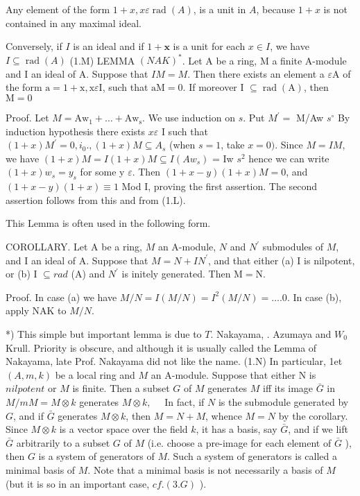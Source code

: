 Any element of the form $1+x, x \varepsilon \operatorname{rad}(A)$, is a unit in $A$, because $1+x$ is not contained in any maximal ideal.

Conversely, if $I$ is an ideal and if $1+\mathbf{x}$ is a unit for each $x \in I$, we have $I \subseteq \operatorname{rad}(A)$ (1.M) LEMMA $(N A K)^{*}$. Let A be a ring, M a finite A-module and I an ideal of A. Suppose that $I M=M$. Then there exists an element a $\varepsilon \mathrm{A}$ of the form $\mathrm{a}=1+\mathrm{x}, \mathrm{x} \varepsilon \mathrm{I}$, such that $\mathrm{aM}=0 .$ If moreover I $\subseteq \operatorname{rad}(\mathrm{A})$, then $\mathrm{M}=0$

Proof. Let $M=\mathrm{Aw}_{1}+\ldots+\mathrm{Aw}_{\mathrm{s}}$. We use induction on $s$. Put $M^{\prime}=$ M/Aw $s^{\circ}$ By induction hypothesis there exists $x \varepsilon$ I such that $(1+x) M^{\prime}=0, i_{0} .,(1+x) M \subseteq A_{s}$ (when $s=1$, take $x=0)$. Since $M=I M$, we have $(1+x) M=I(1+x) M \subseteq I\left(A w_{s}\right)$ = Iw $s^{2}$ hence we can write $(1+x) w_{s}=y_{s}$ for some y $\varepsilon$. Then $(1+x-y)(1+x) M=0$, and $(1+x-y)(1+x) \equiv 1$ Mod I, proving the first assertion. The second assertion follows from this and from (1.L).

This Lemma is often used in the following form.

COROLLARY. Let A be a ring, $M$ an A-module, $N$ and $N^{\prime}$ submodules of $M$, and I an ideal of A. Suppose that $M=N+I N^{\prime}$, and that either (a) I is nilpotent, or (b) I $\subseteq r a d$ (A) and $N^{\prime}$ is initely generated. Then $\mathrm{M}=\mathrm{N}$.

Proof. In case (a) we have $M / N=I(M / N)=I^{2}(M / N)=\ldots .0$. In case (b), apply NAK to $M / N$.

*) This simple but important lemma is due to $T$. Nakayama, . Azumaya and $W_{0}$ Krull. Priority is obscure, and although it is usually called the Lemma of Nakayama, late Prof. Nakayama did not like the name. (1.N) In particular, 1et $(A, m, k)$ be a local ring and $M$ an A-module. Suppose that either $\mathrm{N}$ is $n i l p o t e n t$ or $M$ is finite. Then a subset $G$ of $M$ generates $M$ iff its image $\bar{G}$ in $M / m M=M \otimes k$ generates $M \otimes k, \quad$ In fact, if $N$ is the submodule generated by $G$, and if $\bar{G}$ generates $M \otimes k$, then $M=N+M$, whence $M=N$ by the corollary. Since $M \otimes k$ is a vector space over the field $k$, it has a basis, say $\bar{G}$, and if we lift $\bar{G}$ arbitrarily to a subset $G$ of $M$ (i.e. choose a pre-image for each element of $\bar{G}$ ), then $G$ is a system of generators of $M$. Such a system of generators is called a minimal basis of $M$. Note that a minimal basis is not necessarily a basis of $M$ (but it is so in an important case, $c f .(3 . G)$ ).

